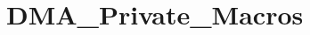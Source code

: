 \hypertarget{group___d_m_a___private___macros}{}\section{D\+M\+A\+\_\+\+Private\+\_\+\+Macros}
\label{group___d_m_a___private___macros}
